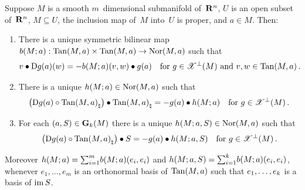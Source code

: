 \begin{lemma}
    \label{al:2.5(1)}
    Suppose $M$ is a smooth $m$~dimensional submanifold of~$\mathbf{R}^{n}$, $U$ is an open subset
    of~$\mathbf{R}^{n}$, $M \subseteq U$, the inclusion map of~$M$ into~$U$ is proper, and $a \in
    M$. Then:
    \begin{enumerate}
        \item There is a unique symmetric bilinear map $b(M;a) : \operatorname{Tan}(M,a) \times \operatorname{Tan}(M,a) \to
            \operatorname{Nor}(M,a)$ such that
            \begin{displaymath}
                v \bullet \mathrm{D} g(a)(w) = - b(M;a)(v,w) \bullet g(a) \quad \text{for $g \in
                \mathscr{X}^\perp(M)$ and $v, w \in \operatorname{Tan}(M,a)$} \,.
            \end{displaymath}
        \item There is a unique $h(M;a) \in \operatorname{Nor}(M,a)$ such that
            \begin{displaymath}
                \big( \mathrm{D} g(a) \circ {\operatorname{Tan}(M,a)}_\natural \big) \bullet {\operatorname{Tan}(M,a)}_\natural = -
                g(a) \bullet h(M;a) \quad \text{for $g \in \mathscr{X}^\perp(M)$} \,.
            \end{displaymath}
        \item For each $(a,S) \in \mathbf{G}_{k}(M)$ there is a unique $h(M;a,S) \in \operatorname{Nor}(M,a)$ such that
            \begin{displaymath}
                \big( \mathrm{D} g(a) \circ {\operatorname{Tan}(M,a)}_\natural \big) \bullet S = - g(a) \bullet
                h(M;a,S) \quad \text{for $g \in \mathscr{X}^\perp(M)$} \,.
            \end{displaymath}
    \end{enumerate}
    Moreover $h(M;a) = {\textstyle\sum_{i=1}^{m}} b(M;a)(e_i,e_i)$ and $h(M;a,S) = {\textstyle\sum_{i=1}^{k}}
    b(M;a)(e_i,e_i)$, whenever $e_1, \ldots, e_m$ is an orthonormal basis of $\operatorname{Tan}(M,a)$ such
    that $e_1, \ldots, e_{k}$ is a basis of $\operatorname{im} S$.
\end{lemma}

